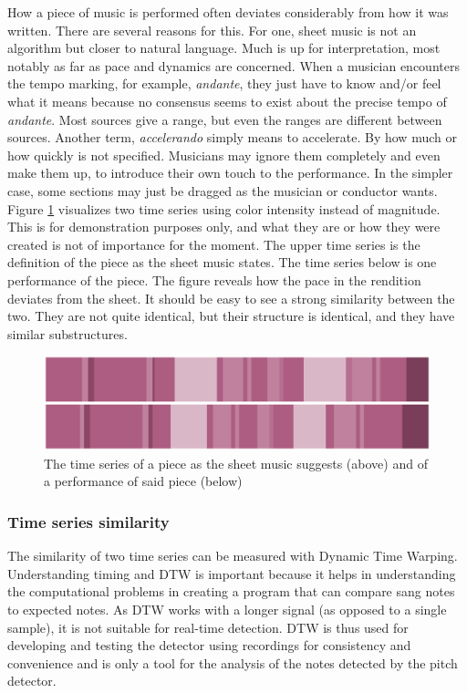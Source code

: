 How a piece of music is performed often deviates considerably from how it was written. There are several reasons for this. For one, sheet music is not an algorithm but closer to natural language. Much is up for interpretation, most notably as far as pace and dynamics are concerned. When a musician encounters the tempo marking, for example, \textit{andante}, they just have to know and/or feel what it means because no consensus seems to exist about the precise tempo of \textit{andante}. Most sources give a range, but even the ranges are different between sources. Another term, \textit{accelerando} simply means to accelerate. By how much or how quickly is not specified. Musicians may ignore them completely and even make them up, to introduce their own touch to the performance. In the simpler case, some sections may just be dragged as the musician or conductor wants. Figure \ref{fig:performance-sheet} visualizes two time series using color intensity instead of magnitude. This is for demonstration purposes only, and what they are or how they were created is not of importance for the moment. The upper time series is the definition of the piece as the sheet music states. The time series below is one performance of the piece. The figure reveals how the pace in the rendition deviates from the sheet. It should be easy to see a strong similarity between the two. They are not quite identical, but their structure is identical, and they have similar substructures. 

\begin{figure}[ht]
    \centering
    \includegraphics[width=\textwidth]{./images/performance-sheet.png}
    \caption{The time series of a piece as the sheet music suggests (above) and of a performance of said piece (below)\label{fig:performance-sheet}}
\end{figure}

\subsubsection{Time series similarity}
The similarity of two time series can be measured with Dynamic Time Warping. Understanding timing and DTW is important because it helps in understanding the computational problems in  creating a program that can compare sang notes to expected notes. As DTW works with a longer signal (as opposed to a single sample), it is not suitable for real-time detection. DTW is thus used for developing and testing the detector using recordings for consistency and convenience and is only a tool for the analysis of the notes detected by the pitch detector. 

